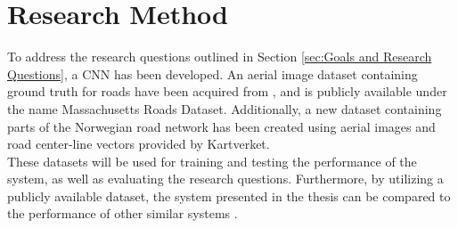 \section{Research Method}
\label{sec:researchMethod}
To address the research questions outlined in Section \ref{sec:Goals and Research Questions}, a \ac{CNN} has been developed. An aerial image dataset containing ground truth for roads have been acquired from \citep{MnihThesis}, and is publicly available under the name Massachusetts Roads Dataset. Additionally, a new dataset containing parts of the Norwegian road network has been created using aerial images and road center-line vectors provided by Kartverket.\\   

These datasets will be used for training and testing the performance of the system, as well as evaluating the research questions. Furthermore, by utilizing a publicly available dataset, the system presented in the thesis can be compared to the performance of other similar systems \citep{Mnih_aerial_images_noisy}\citep{MnihThesis}\citep{saito_building_and_roads}.  